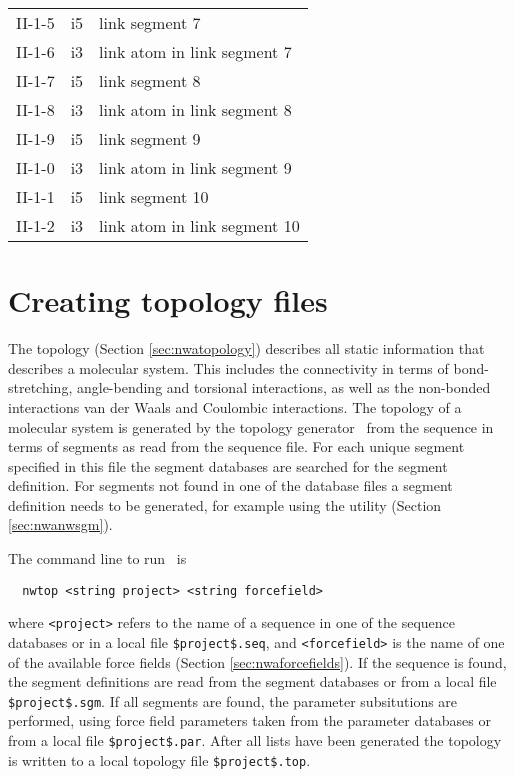 \begin{center}
\begin{tabular*}{150mm}{p{12mm}p{12mm}l}
II-1-5 & i5     & link segment 7\\
II-1-6 & i3     & link atom in link segment 7\\
II-1-7 & i5     & link segment 8\\
II-1-8 & i3     & link atom in link segment 8\\
II-1-9 & i5     & link segment 9\\
II-1-0 & i3     & link atom in link segment 9\\
II-1-1 & i5     & link segment 10\\
II-1-2 & i3     & link atom in link segment 10\\
\hline\hline
\end{tabular*}
\end{center}

\section{Creating topology files}
\label{sec:nwanwtop}

The topology (Section \ref{sec:nwatopology}) describes all static information
that describes a molecular system. This includes the connectivity in
terms of bond-stretching, angle-bending and torsional interactions, as well as
the non-bonded interactions van der Waals and Coulombic interactions.
The topology of a molecular system is generated by the topology
generator \nwtop\ from the sequence in terms of segments as read from
the sequence file. For each unique segment specified in this file the 
segment databases are searched for the segment definition. For
segments not found in one of the database files a segment definition
needs to be generated, for example using the utility \nwsgm (Section \ref{sec:nwanwsgm}).

The command line to run \nwtop\ is
\begin{verbatim}
  nwtop <string project> <string forcefield>
\end{verbatim}
where \verb+<project>+ refers to the name of a sequence in one of the
sequence databases or in a local file \verb+$project$.seq+, and
\verb+<forcefield>+ is the name of one of the available force fields 
(Section \ref{sec:nwaforcefields}).
If the sequence is found, the segment definitions are read from the
segment databases or from a local file \verb+$project$.sgm+. If all
segments are found, the parameter subsitutions are performed, using
force field parameters taken from the parameter databases or from a 
local file \verb+$project$.par+. After all lists have been generated the
topology is written to a local topology file \verb+$project$.top+.

